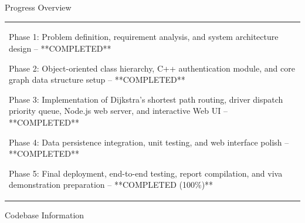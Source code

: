 \documentclass[12pt,a4paper]{article}
\newcommand{\sectiontitle}[1]{%
    {\color{GEUBlue}
    \fontsize{18}{22}\selectfont #1}
}
\newcommand{\answerbox}[2]{%
    \begin{tabularx}{\textwidth}{
        |>{\RaggedRight\arraybackslash}X|}
        \hline
        \parbox[t][#1][t]{\dimexpr\linewidth-12pt\relax}{
            \vspace{5pt}
            \fontsize{11}{13}\selectfont #2
        }\\
        \hline
    \end{tabularx}
}
\begin{document}
\vspace{0.75cm}

\sectiontitle{Progress Overview}

\vspace{0.05cm}

\vspace{0.25cm}

\answerbox{5.00cm}{

Phase 1: Problem definition, requirement analysis, and system architecture design -- **COMPLETED**

Phase 2: Object-oriented class hierarchy, C++ authentication module, and core graph data structure setup -- **COMPLETED**

Phase 3: Implementation of Dijkstra's shortest path routing, driver dispatch priority queue, Node.js web server, and interactive Web UI -- **COMPLETED**

Phase 4: Data persistence integration, unit testing, and web interface polish -- **COMPLETED**

Phase 5: Final deployment, end-to-end testing, report compilation, and viva demonstration preparation -- **COMPLETED (100\%)**

}

\newpage


\vspace*{0.20cm}

\vspace*{0.20cm}
\sectiontitle{Codebase Information}
\vspace{0.05cm}
\vspace{0.20cm}
\end{document}
